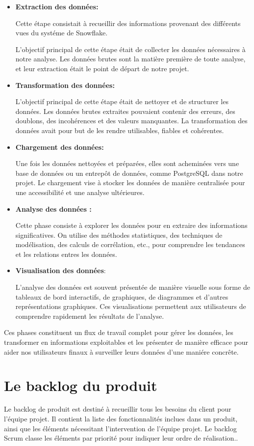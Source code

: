   \begin{itemize}
  \item \textbf{Extraction des données: }
  \par Cette étape consistait à recueillir des informations provenant des différents vues du systéme de Snowflake.
\par L'objectif principal de cette étape était de collecter les données nécessaires à notre analyse. Les données brutes sont la matière première de toute analyse, et leur extraction était le point de départ de notre projet.
  \item \textbf{Transformation des données:}
  \par L'objectif principal de cette étape était de nettoyer et de structurer les données. Les données brutes extraites pouvaient contenir des erreurs, des doublons, des incohérences et des valeurs manquantes. La transformation des données avait pour but de les rendre utilisables, fiables et cohérentes.
   \item \textbf{Chargement des données:}
  \par Une fois les données nettoyées et préparées, elles sont acheminées vers une base de données ou un entrepôt de données, comme PostgreSQL dans notre projet. Le chargement vise à stocker les données de manière centralisée pour une accessibilité et une analyse ultérieures.
   \item \textbf{Analyse des données :}
  \par Cette phase consiste à explorer les données pour en extraire des informations significatives. On utilise des méthodes statistiques, des techniques de modélisation, des calculs de corrélation, etc., pour comprendre les tendances et les relations entres les données.
   \item \textbf{Visualisation des données}:
  \par L'analyse des données est souvent présentée de manière visuelle sous forme de tableaux de bord interactifs, de graphiques, de diagrammes et d'autres représentations graphiques. Ces visualisations permettent aux utilisateurs de comprendre rapidement les résultats de l'analyse.
  \end{itemize}
  \par Ces phases constituent un flux de travail complet pour gérer les données, les transformer en informations exploitables et les présenter de manière efficace pour aider nos utilisateurs finaux à surveiller leurs données d'une maniére concrête.
\section{Le backlog du produit}
\par Le backlog de produit est destiné à recueillir tous les besoins du client pour l'équipe projet. Il contient la liste des fonctionnalités inclues dans un produit, ainsi que les éléments nécessitant l'intervention de l'équipe projet. Le backlog Scrum classe les éléments par priorité pour indiquer leur ordre de réalisation.\cite{blog}.

